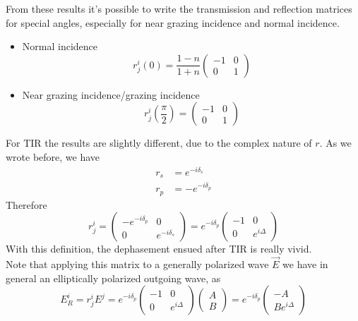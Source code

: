 \documentclass[../electromagnetism.tex]{subfiles}
\begin{document}
From these results it's possible to write the transmission and reflection matrices for special angles, especially for near grazing incidence and normal incidence.\\
\begin{itemize}
\item Normal incidence
	\begin{equation}
		r^i_j(0)=\frac{1-n}{1+n}\begin{pmatrix}
			-1&0\\
			0&1
		\end{pmatrix}
		\label{eq:rmatninc.rjon}
	\end{equation}
\item Near grazing incidence/grazing incidence
	\begin{equation}
		r^i_j\left( \frac{\pi}{2} \right)=\begin{pmatrix}
			-1&0\\
			0&1
		\end{pmatrix}
		\label{eq:rmatnginc.rjon}
	\end{equation}
\end{itemize}
For TIR the results are slightly different, due to the complex nature of $r$. As we wrote before, we have
\begin{equation*}
	\begin{aligned}
		r_s&= e^{-i\delta_s}\\
		r_p&= -e^{-i\delta_p}
	\end{aligned}
\end{equation*}
Therefore
\begin{equation}
	r^i_j=\begin{pmatrix}
		-e^{-i\delta_p}&0\\
		0&e^{-i\delta_s}
	\end{pmatrix}=e^{-i\delta_p}\begin{pmatrix}
		-1&0\\
		0&e^{i\Delta}
	\end{pmatrix}
	\label{eq:rmattir.rjon}
\end{equation}
With this definition, the dephasement ensued after TIR is really vivid.\\
Note that applying this matrix to a generally polarized wave $\vec{E}$ we have in general an elliptically polarized outgoing wave, as
\begin{equation}
	E_R^i=r^i_jE^j=e^{-i\delta_p}\begin{pmatrix}
		-1&0\\
		0&e^{i\Delta}
	\end{pmatrix}\begin{pmatrix}
		A\\B
	\end{pmatrix}=e^{-i\delta_p}\begin{pmatrix}
		-A\\Be^{i\Delta}
	\end{pmatrix}
	\label{eq:tireff.rjon}
\end{equation}
\end{document}
